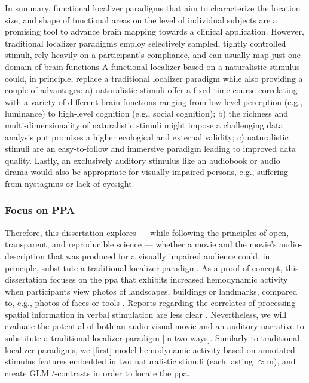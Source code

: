 In summary, functional localizer paradigms that aim to characterize the location
size, and shape of functional areas on the level of individual subjects are a
promising tool to advance brain mapping towards a clinical application.
However, traditional localizer paradigms employ selectively sampled, tightly
controlled stimuli, rely heavily on a participant's compliance, and can usually
map just one domain of brain functions
A functional localizer based on a naturalistic stimulus could, in principle,
replace a traditional localizer paradigm while also providing a couple of
advantages:
a) naturalistic stimuli offer a fixed time course correlating with a variety of
different brain functions ranging from low-level perception (e.g., luminance) to
high-level cognition (e.g., social cognition);
b) the richness and multi-dimensionality of naturalistic stimuli might impose a
challenging data analysis put promises a higher ecological and external
validity;
c) naturalistic stimuli are an easy-to-follow and immersive paradigm leading to
improved data quality.
Lastly, an exclusively auditory stimulus like an audiobook or audio drama would
also be appropriate for visually impaired persons, e.g., suffering from
nystagmus or lack of eyesight.

\subsubsection{Focus on PPA}




Therefore, this dissertation explores --- while following the principles of
open, transparent, and reproducible science --- whether a movie and the movie's
audio-description that was produced for a visually impaired audience could, in
principle, substitute a traditional localizer paradigm.
As a proof of concept, this dissertation focuses on the \ac{ppa} that exhibits
increased hemodynamic activity when participants view photos of landscapes,
buildings or landmarks, compared to, e.g., photos of faces or tools
\citep[e.g.,][for reviews]{epstein2014neural, aminoff2013role}.
Reports regarding the correlates of processing spatial information in verbal
stimulation are less clear \citep{aziz2008modulation}.
%
Nevertheless, we will evaluate the potential of both an audio-visual movie and
an auditory narrative to substitute a traditional localizer paradigm [in two
ways].
Similarly to traditional localizer paradigms, we [first] model hemodynamic
activity based on annotated stimulus features embedded in two naturalistic
stimuli (each lasting $\approx$\unit[120]{m}), and create GLM $t$-contrasts in
order to locate the \ac{ppa}.



